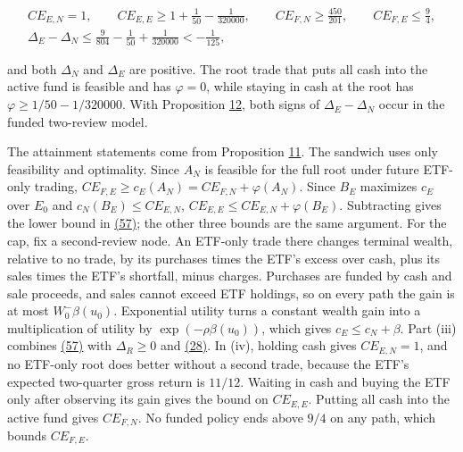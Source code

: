 \documentclass[11pt]{article}
\begin{document}
\begin{equation*}
\begin{gathered}
CE_{E,N}=1,\qquad
CE_{E,E}\geq1+\frac1{50}-\frac1{320000},\qquad
CE_{F,N}\geq\frac{450}{201},\qquad
CE_{F,E}\leq\frac94,\\
\Delta_E-\Delta_N\leq\frac9{804}-\frac1{50}+\frac1{320000}
 <-\frac1{125},
\end{gathered}\tag{59}\label{eq:59}
\end{equation*}

and both \(\Delta_N\) and \(\Delta_E\) are positive. The root
trade that puts all cash into the active fund is feasible and
has \(\varphi=0\), while staying in cash at the root has
\(\varphi\geq1/50-1/320000\). With Proposition \hyperref[res:Proposition-12]{12}, both signs
of \(\Delta_E-\Delta_N\) occur in the funded two-review model.

The attainment statements come from Proposition \hyperref[res:Proposition-11]{11}. The
sandwich uses only feasibility and optimality. Since \(A_N\) is
feasible for the full root under future ETF-only trading,
\(CE_{F,E}\geq c_E(A_N)=CE_{F,N}+\varphi(A_N)\). Since
\(B_E\) maximizes \(c_E\) over \(E_0\) and
\(c_N(B_E)\leq CE_{E,N}\),
\(CE_{E,E}\leq CE_{E,N}+\varphi(B_E)\). Subtracting gives the
lower bound in \hyperref[eq:57]{(57)}; the other three bounds are the same
argument. For the cap, fix a second-review node. An ETF-only
trade there changes terminal wealth, relative to no trade, by
its purchases times the ETF's excess over cash, plus its sales
times the ETF's shortfall, minus charges. Purchases are funded
by cash and sale proceeds, and sales cannot exceed ETF holdings,
so on every path the gain is at most \(W_0^-\beta(u_0)\).
Exponential utility turns a constant wealth gain into a
multiplication of utility by \(\exp(-\rho\beta(u_0))\), which
gives \(c_E\leq c_N+\beta\). Part (iii) combines \hyperref[eq:57]{(57)} with
\(\Delta_R\geq0\) and \hyperref[eq:28]{(28)}. In (iv), holding cash gives
\(CE_{E,N}=1\), and no ETF-only root does better without a
second trade, because the ETF's expected two-quarter gross
return is \(11/12\). Waiting in cash and buying the ETF only
after observing its gain gives the bound on \(CE_{E,E}\).
Putting all cash into the active fund gives \(CE_{F,N}\). No
funded policy ends above \(9/4\) on any path, which bounds
\(CE_{F,E}\).
\end{document}
